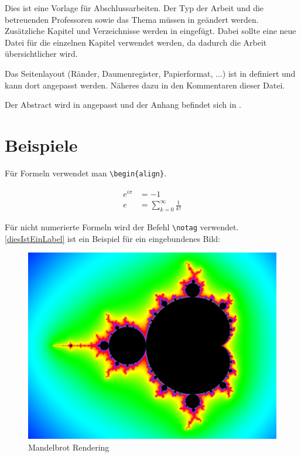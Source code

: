 
Dies ist eine Vorlage für Abschlussarbeiten. Der Typ der Arbeit und die betreuenden Professoren sowie das Thema müssen in  geändert werden. Zusätzliche Kapitel und Verzeichnisse werden in  eingefügt. Dabei sollte eine neue  Datei für die einzelnen Kapitel verwendet werden, da dadurch die Arbeit übersichtlicher wird.

Das Seitenlayout (Ränder, Daumenregister, Papierformat, ...) ist in  definiert und kann dort angepasst werden. Näheres dazu in den Kommentaren dieser Datei.

Der Abstract wird in  angepasst und der Anhang befindet sich in .

\section{Beispiele}

Für Formeln verwendet man \lstinline|\begin{align}|.
	
\begin{align}
	e^{i \pi} &= -1 \\
	e &= \sum_{k=0}^{\infty}\frac{1}{k!}
\end{align}

Für nicht numerierte Formeln wird der Befehl \lstinline|\notag| verwendet.
\\
\autoref{diesIstEinLabel} ist ein Beispiel für ein eingebundenes Bild:

\begin{figure}[H] %
	\centering
	\includegraphics[width=.8\linewidth]{Bilder/mandelbrot}
	\caption{Mandelbrot Rendering}
	\label{diesIstEinLabel} %
\end{figure}


